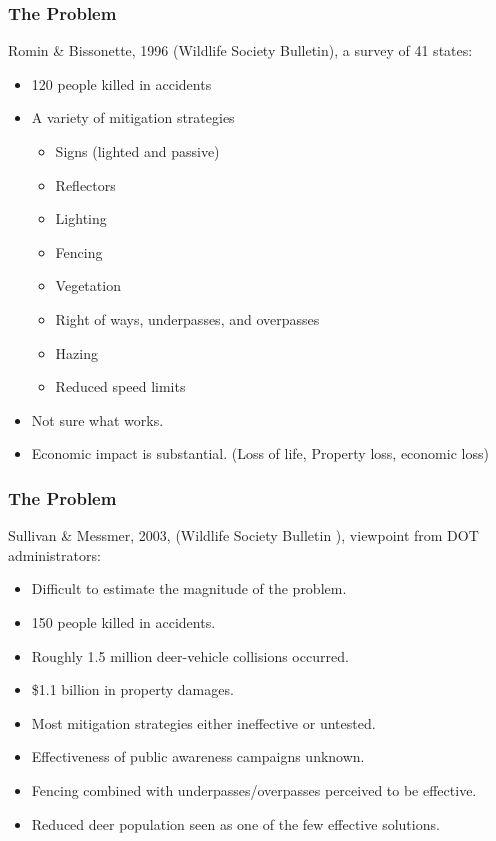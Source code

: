\documentclass{beamer}   %
\begin{document}
\begin{frame}
  \frametitle{The Problem}

  Romin \& Bissonette, 1996 (Wildlife Society Bulletin), a survey of
  41 states:
  \begin{itemize}
  \item 120 people killed in accidents
  \item A variety of mitigation strategies
    \begin{itemize}
    \item Signs (lighted and passive) %
    \item Reflectors
    \item Lighting
    \item Fencing 
    \item Vegetation
    \item Right of ways, underpasses, and overpasses
    \item Hazing
    \item Reduced speed limits
    \end{itemize}
  \item Not sure what works.
  \item Economic impact is substantial. (Loss of life, Property loss,
    economic loss)
  \end{itemize}
  
\end{frame}

\begin{frame}
  \frametitle{The Problem}
  
  Sullivan \& Messmer, 2003, (Wildlife Society Bulletin ), viewpoint
  from DOT administrators:
  \begin{itemize}
  \item Difficult to estimate the magnitude of the problem.
  \item 150 people killed in accidents.
  \item Roughly 1.5 million deer-vehicle collisions occurred.
  \item \$1.1  billion in property damages.
  \item Most mitigation strategies either ineffective or untested.
  \item Effectiveness of public awareness campaigns unknown.
  \item Fencing combined with underpasses/overpasses perceived to be
    effective.
  \item Reduced deer population seen as one of the few effective
    solutions.
  \end{itemize}

\end{frame}
\end{document}
